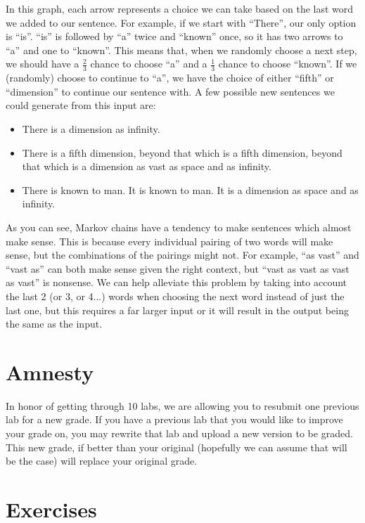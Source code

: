 \documentclass[11pt]{cselabheader}
\begin{document}
In this graph, each arrow represents a choice we can take based on the last word we added to our sentence. For example, if we start with ``There'', our only option is ``is''. ``is'' is followed by ``a'' twice and ``known'' once, so it has two arrows to ``a'' and one to ``known''. This means that, when we randomly choose a next step, we should have a $\frac{2}{3}$ chance to choose ``a'' and a $\frac{1}{3}$ chance to choose ``known''. If we (randomly) choose to continue to ``a'', we have the choice of either ``fifth'' or ``dimension'' to continue our sentence with. A few possible new sentences we could generate from this input are:
\begin{itemize}
\item There is a dimension as infinity.
\item There is a fifth dimension, beyond that which is a fifth dimension, beyond that which is a dimension as vast as space and as infinity.
\item There is known to man. It is known to man. It is a dimension as space and as infinity.
\end{itemize}

As you can see, Markov chains have a tendency to make sentences which almost make sense. This is because every individual pairing of two words will make sense, but the combinations of the pairings might not. For example, ``as vast'' and ``vast as'' can both make sense given the right context, but ``vast as vast as vast as vast'' is nonsense. We can help alleviate this problem by taking into account the last 2 (or 3, or 4...) words when choosing the next word instead of just the last one, but this requires a far larger input or it will result in the output being the same as the input.


\section{Amnesty}
\label{sec:amnesty}
In honor of getting through 10 labs, we are allowing you to resubmit one previous lab for a new grade. If you have a previous lab that you would like to improve your grade on, you may rewrite that lab and upload a new version to be graded. This new grade, if better than your original (hopefully we can assume that will be the case) will replace your original grade.

\pagebreak

\section{Exercises}
\label{sec:ex}
\end{document}

